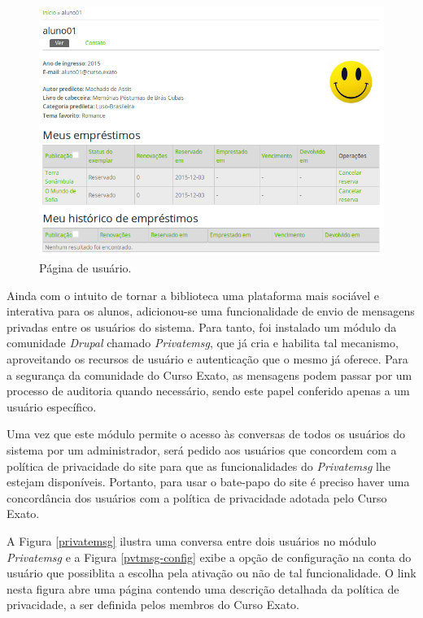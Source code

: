 \documentclass[a4paper]{article}
\begin{document}
\begin{figure}[pbth!]
\centering
\caption{Página de usuário.\label{userpage}}
\includegraphics[width=140mm]{img/userpage.png}
\end{figure}

Ainda com o intuito de tornar a biblioteca uma plataforma mais sociável e interativa para os alunos, adicionou-se uma funcionalidade de envio de mensagens privadas entre os usuários do sistema. Para tanto, foi instalado um módulo da comunidade \textit{Drupal} chamado \textit{Privatemsg}, que já cria e habilita tal mecanismo, aproveitando os recursos de usuário e autenticação que o mesmo já oferece. Para a segurança da comunidade do Curso Exato, as mensagens podem passar por um processo de auditoria quando necessário, sendo este papel conferido apenas a um usuário específico.

Uma vez que este módulo permite o acesso às conversas de todos os usuários do sistema por um administrador, será pedido aos usuários que concordem com a política de privacidade do site para que as funcionalidades do \textit{Privatemsg} lhe estejam disponíveis. Portanto, para usar o bate-papo do site é preciso haver uma concordância dos usuários com a política de privacidade adotada pelo Curso Exato.

A Figura \ref{privatemsg} ilustra uma conversa entre dois usuários no módulo \textit{Privatemsg} e a Figura \ref{pvtmsg-config} exibe a opção de configuração na conta do usuário que possiblita a escolha pela ativação ou não de tal funcionalidade. O link nesta figura abre uma página contendo uma descrição detalhada da política de privacidade, a ser definida pelos membros do Curso Exato.
\end{document}
